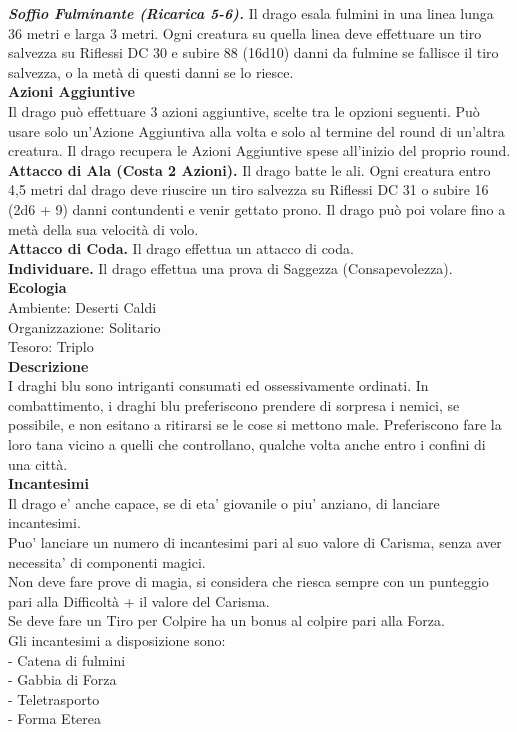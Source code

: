 \begin{multicols}{2}
\emph{\textbf{Soffio Fulminante (Ricarica 5-6).}} Il drago esala fulmini in una linea lunga 36 metri e larga 3 metri. Ogni creatura su quella linea deve effettuare un tiro salvezza su Riflessi DC  30 e subire 88 (16d10) danni da fulmine se fallisce il tiro salvezza, o la metà di questi danni se lo riesce.\\
\textbf{Azioni Aggiuntive}\\
Il drago può effettuare 3 azioni aggiuntive, scelte tra le opzioni seguenti. Può usare solo un'Azione Aggiuntiva alla volta e solo al termine del round di un'altra creatura. Il drago recupera le Azioni Aggiuntive spese all'inizio del proprio round.\\
\textbf{Attacco di Ala (Costa 2 Azioni).} Il drago batte le ali. Ogni creatura entro 4,5 metri dal drago deve riuscire un tiro salvezza su Riflessi DC  31 o subire 16 (2d6 + 9) danni contundenti e venir gettato prono. Il drago può poi volare fino a metà della sua velocità di volo.\\
\textbf{Attacco di Coda.} Il drago effettua un attacco di coda.\\
\textbf{Individuare.} Il drago effettua una prova di Saggezza (Consapevolezza).\\
\textbf{Ecologia}\\
Ambiente: Deserti Caldi\\
Organizzazione: Solitario\\
Tesoro: Triplo\\
\textbf{Descrizione}\\
I draghi blu sono intriganti consumati ed ossessivamente ordinati. In combattimento, i draghi blu preferiscono prendere di sorpresa i nemici, se possibile, e non esitano a ritirarsi se le cose si mettono male. Preferiscono fare la loro tana vicino a quelli che controllano, qualche volta anche entro i confini di una città.\\
\textbf{Incantesimi}\\
Il drago e' anche capace, se di eta' giovanile o piu' anziano, di lanciare incantesimi.\\
Puo' lanciare un numero di incantesimi pari al suo valore di Carisma, senza aver necessita' di componenti magici.\\
Non deve fare prove di magia, si considera che riesca sempre con un punteggio pari alla Difficoltà + il valore del Carisma.\\
Se deve fare un Tiro per Colpire ha un bonus al colpire pari alla Forza.\\
Gli incantesimi a disposizione sono:\\
- Catena di fulmini\\
- Gabbia di Forza\\
- Teletrasporto\\
- Forma Eterea\\


\end{multicols}
